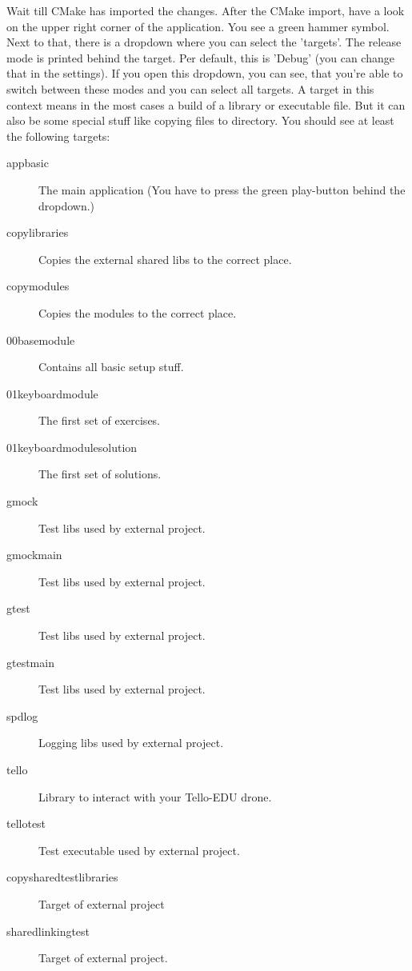 Wait till CMake has imported the changes. After the CMake import, have a look on the upper right corner of the application.
You see a green hammer symbol. Next to that, there is a dropdown where you can select the 'targets'.
The release mode is printed behind the target. Per default, this is 'Debug' (you can change that in the settings).
If you open this dropdown, you can see, that you're able to switch between these modes and you can select all
targets. A target in this context means in the most cases a build of a library or executable file. But it can also
be some special stuff like copying files to directory. You should see at least the following targets:
\begin{description}
    \item[app\textunderscore basic] The main application (You have to press the green play-button behind the dropdown.)
    \item[copy\textunderscore libraries] Copies the external shared libs to the correct place.
    \item[copy\textunderscore modules] Copies the modules to the correct place.
    \item[00\textunderscore base\textunderscore module] Contains all basic setup stuff.
    \item[01\textunderscore keyboard\textunderscore module] The first set of exercises.
    \item[01\textunderscore keyboard\textunderscore module\textunderscore solution] The first set of solutions.
    \item[gmock] Test libs used by external project.
    \item[gmock\textunderscore main] Test libs used by external project.
    \item[gtest] Test libs used by external project.
    \item[gtest\textunderscore main] Test libs used by external project.
    \item[spdlog] Logging libs used by external project.
    \item[tello] Library to interact with your Tello-EDU drone.
    \item[tello\textunderscore test] Test executable used by external project.
    \item[copy\textunderscore shared\textunderscore test\textunderscore libraries] Target of external project
    \item[shared\textunderscore linking\textunderscore test] Target of external project.
\end{description}
